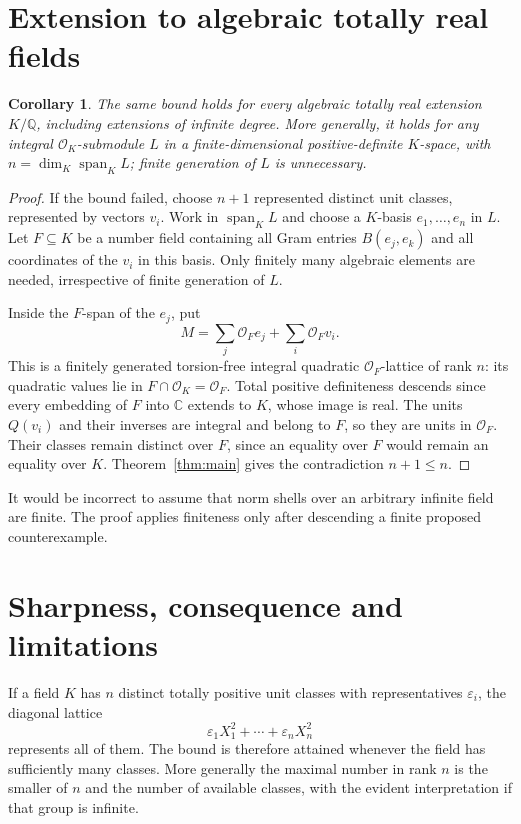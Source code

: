 \documentclass[11pt]{article}
\newtheorem{corollary}[theorem]{Corollary}
\newcommand{\OK}{\mathcal O_K}
\newcommand{\OF}{\mathcal O_F}
\newcommand{\Q}{\mathbb Q}
\begin{document}
\section{Extension to algebraic totally real fields}
\begin{corollary}\label{cor:infinite}
The same bound holds for every algebraic totally real extension $K/\Q$, including extensions of infinite degree. More generally, it holds for any integral $\OK$-submodule $L$ in a finite-dimensional positive-definite $K$-space, with $n=\dim_K\operatorname{span}_K L$; finite generation of $L$ is unnecessary.
\end{corollary}
\begin{proof}
If the bound failed, choose $n+1$ represented distinct unit classes, represented by vectors $v_i$. Work in $\operatorname{span}_K L$ and choose a $K$-basis $e_1,\ldots,e_n$ in $L$. Let $F\subseteq K$ be a number field containing all Gram entries $B(e_j,e_k)$ and all coordinates of the $v_i$ in this basis. Only finitely many algebraic elements are needed, irrespective of finite generation of $L$.

Inside the $F$-span of the $e_j$, put
\[
 M=\sum_j\OF e_j+\sum_i\OF v_i.
\]
This is a finitely generated torsion-free integral quadratic $\OF$-lattice of rank $n$: its quadratic values lie in $F\cap\OK=\OF$. Total positive definiteness descends since every embedding of $F$ into $\mathbb C$ extends to $K$, whose image is real. The units $Q(v_i)$ and their inverses are integral and belong to $F$, so they are units in $\OF$. Their classes remain distinct over $F$, since an equality over $F$ would remain an equality over $K$. Theorem~\ref{thm:main} gives the contradiction $n+1\leq n$.
\end{proof}

It would be incorrect to assume that norm shells over an arbitrary infinite field are finite. The proof applies finiteness only after descending a finite proposed counterexample.

\section{Sharpness, consequence and limitations}\label{sec:limits}
If a field $K$ has $n$ distinct totally positive unit classes with representatives $\varepsilon_i$, the diagonal lattice
\[
 \varepsilon_1X_1^2+\cdots+\varepsilon_nX_n^2
\]
represents all of them. The bound is therefore attained whenever the field has sufficiently many classes. More generally the maximal number in rank $n$ is the smaller of $n$ and the number of available classes, with the evident interpretation if that group is infinite.
\end{document}
